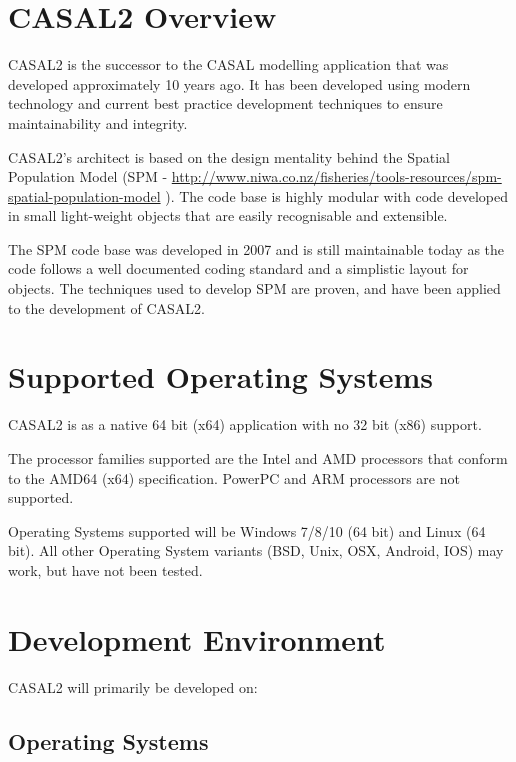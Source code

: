 \documentclass[a4paper,11pt,twoside,pdftex,draft]{article}
\begin{document}
\hypertarget{casal2-overview}{%
\section{CASAL2 Overview}\label{casal2-overview}}

CASAL2 is the successor to the CASAL modelling application that was
developed approximately 10 years ago. It has been developed using modern
technology and current best practice development techniques to ensure
maintainability and integrity.

CASAL2's architect is based on the design mentality behind the Spatial
Population Model (SPM -
\href{http://www.niwa.co.nz/fisheries/tools-resources/spm-spatial-population-model}{{http://www.niwa.co.nz/fisheries/tools-resources/spm-spatial-population-model}}
). The code base is highly modular with code developed in small
light-weight objects that are easily recognisable and extensible.

The SPM code base was developed in 2007 and is still maintainable today
as the code follows a well documented coding standard and a simplistic
layout for objects. The techniques used to develop SPM are proven, and
have been applied to the development of CASAL2.

\hypertarget{supported-operating-systems}{%
\section{Supported Operating
Systems}\label{supported-operating-systems}}

CASAL2 is as a native 64 bit (x64) application with no 32 bit (x86)
support.

The processor families supported are the Intel and AMD processors that
conform to the AMD64 (x64) specification. PowerPC and ARM processors are
not supported.

Operating Systems supported will be Windows 7/8/10 (64 bit) and Linux
(64 bit). All other Operating System variants (BSD, Unix, OSX, Android,
IOS) may work, but have not been tested.

\hypertarget{development-environment}{%
\section{\texorpdfstring{\textbf{Development
Environment}}{Development Environment}}\label{development-environment}}

CASAL2 will primarily be developed on:

\hypertarget{operating-systems}{%
\subsection{Operating Systems}\label{operating-systems}}
\end{document}
